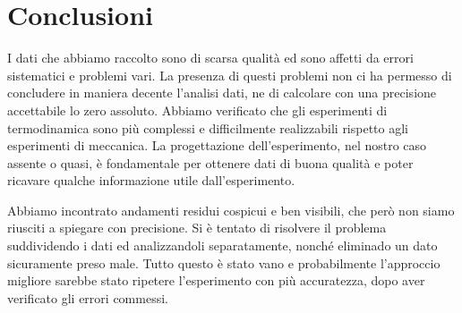 \section{Conclusioni}

I dati che abbiamo raccolto sono di scarsa qualità ed sono affetti da errori sistematici e problemi vari.
La presenza di questi problemi non ci ha permesso di concludere in maniera decente l'analisi dati, ne di
calcolare con una precisione accettabile lo zero assoluto. Abbiamo verificato che gli esperimenti di
termodinamica sono più complessi e difficilmente realizzabili rispetto agli esperimenti di meccanica.
La progettazione dell'esperimento, nel nostro caso assente o quasi, è fondamentale per ottenere dati di buona
qualità e poter ricavare qualche informazione utile dall'esperimento.

Abbiamo incontrato andamenti residui cospicui e ben visibili, che però non siamo riusciti a spiegare con precisione.
Si è tentato di risolvere il problema suddividendo i dati ed analizzandoli separatamente, nonché eliminado un dato
sicuramente preso male. Tutto questo è stato vano e probabilmente l'approccio migliore sarebbe stato ripetere
l'esperimento con più accuratezza, dopo aver verificato gli errori commessi.


